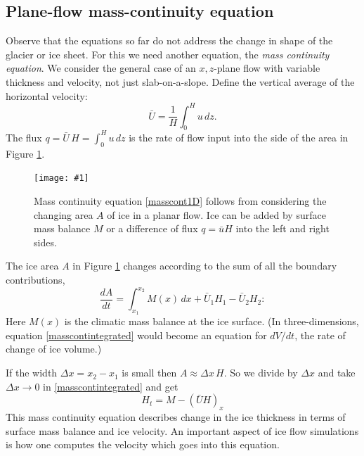 \documentclass[letterpaper,final,12pt,reqno]{amsart}
\newcommand{\onefigsize}[3]{
\begin{figure}[ht]
\centering
\texttt{[image: \#1]}
\caption{#2}
\label{fig:#1}
\end{figure}}
\begin{document}
\subsection*{Plane-flow mass-continuity equation}  Observe that the equations so far do not address the change in shape of the glacier or ice sheet.  For this we need another equation, the \emph{mass continuity equation}.  We consider the general case of an $x,z$-plane flow with variable thickness and velocity, not just slab-on-a-slope.  Define the vertical average of the horizontal velocity:
	$$\bar U = \frac{1}{H}\int_0^{H} u\,dz.$$
The flux $q=\bar U\, H = \int_0^{H} u\,dz$ is the rate of flow input into the side of the area in Figure \ref{fig:slabmasscontfig}.

\onefigsize{slabmasscontfig}{Mass continuity equation \eqref{masscont1D} follows from considering the changing area $A$ of ice in a planar flow.  Ice can be added by surface mass balance $M$ or a difference of flux $q=\bar u H$ into the left and right sides.}{2.5in}

The ice area $A$ in Figure \ref{fig:slabmasscontfig} changes according to the sum of all the boundary contributions,
\begin{equation}
\frac{dA}{dt} = \int_{x_1}^{x_2} M(x)\,dx + \bar U_1 H_1 - \bar U_2 H_2: \label{masscontintegrated}
\end{equation}
Here $M(x)$ is the climatic mass balance at the ice surface.  (In three-dimensions, equation \eqref{masscontintegrated} would become an equation for $dV/dt$, the rate of change of ice volume.)

If the width $\Delta x=x_2-x_1$ is small then $A\approx \Delta x\, H$.  So we divide by $\Delta x$ and take $\Delta x \to 0$ in \eqref{masscontintegrated} and get
\begin{equation}
H_t = M - \left(\bar U H\right)_x \label{masscont1D}
\end{equation}
This mass continuity equation describes change in the ice thickness in terms of surface mass balance and ice velocity.  An important aspect of ice flow simulations is how one computes the velocity which goes into this equation.
\end{document}
